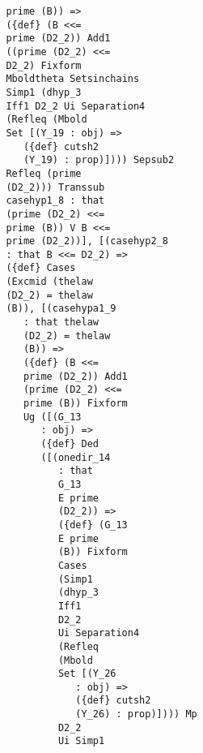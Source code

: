 \documentclass[12pt]{article}
\begin{document}
\begin{verbatim}
                            prime (B)) => 
                            ({def} (B <<= 
                            prime (D2_2)) Add1 
                            ((prime (D2_2) <<= 
                            D2_2) Fixform 
                            Mboldtheta Setsinchains 
                            Simp1 (dhyp_3 
                            Iff1 D2_2 Ui Separation4 
                            (Refleq (Mbold 
                            Set [(Y_19 : obj) => 
                               ({def} cutsh2 
                               (Y_19) : prop)]))) Sepsub2 
                            Refleq (prime 
                            (D2_2))) Transsub 
                            casehyp1_8 : that 
                            (prime (D2_2) <<= 
                            prime (B)) V B <<= 
                            prime (D2_2))], [(casehyp2_8 
                            : that B <<= D2_2) => 
                            ({def} Cases 
                            (Excmid (thelaw 
                            (D2_2) = thelaw 
                            (B)), [(casehypa1_9 
                               : that thelaw 
                               (D2_2) = thelaw 
                               (B)) => 
                               ({def} (B <<= 
                               prime (D2_2)) Add1 
                               (prime (D2_2) <<= 
                               prime (B)) Fixform 
                               Ug ([(G_13 
                                  : obj) => 
                                  ({def} Ded 
                                  ([(onedir_14 
                                     : that 
                                     G_13 
                                     E prime 
                                     (D2_2)) => 
                                     ({def} (G_13 
                                     E prime 
                                     (B)) Fixform 
                                     Cases 
                                     (Simp1 
                                     (dhyp_3 
                                     Iff1 
                                     D2_2 
                                     Ui Separation4 
                                     (Refleq 
                                     (Mbold 
                                     Set [(Y_26 
                                        : obj) => 
                                        ({def} cutsh2 
                                        (Y_26) : prop)]))) Mp 
                                     D2_2 
                                     Ui Simp1 

\end{verbatim}
\end{document}
